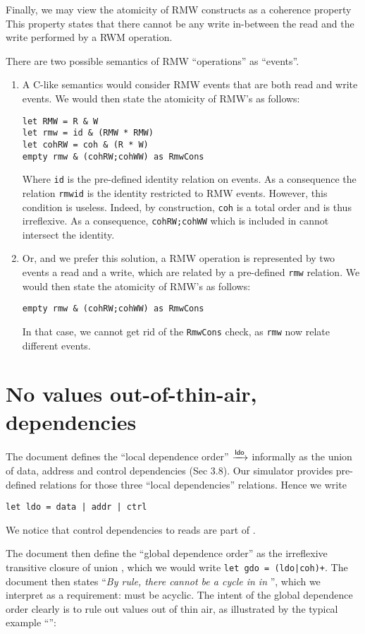 \documentclass[a4paper]{article}
\begin{document}
Finally, we may view the atomicity of RMW constructs as a coherence property
This property states that there cannot be any write in-between the read
and the write performed by a RWM operation.

There are two possible semantics of RMW ``operations'' as ``events''.
\begin{enumerate}
\item
A C-like semantics would consider RMW events that are both read and write
events. We would then state the atomicity of RMW's as follows:
\begin{verbatim}
let RMW = R & W
let rmw = id & (RMW * RMW)
let cohRW = coh & (R * W)
empty rmw & (cohRW;cohWW) as RmwCons
\end{verbatim}
Where \texttt{id} is the pre-defined identity relation on events.
As a consequence the relation \texttt{rmwid} is the identity restricted
to RMW events.
However, this condition is useless. Indeed, by construction,
\texttt{coh} is a total order and is thus irreflexive.
As a consequence, \texttt{cohRW;cohWW} which is included in \coh{}
cannot intersect the identity.
\item Or, and we prefer this solution, a RMW operation is represented
by two events a read and a write, which are related by a pre-defined
\texttt{rmw} relation.
We would then state the atomicity of RMW's as follows:
\begin{verbatim}
empty rmw & (cohRW;cohWW) as RmwCons
\end{verbatim}
In that case, we cannot get rid of the \texttt{RmwCons} check,
as \texttt{rmw} now relate different events.
\end{enumerate}

\section{No values out-of-thin-air, dependencies}
The document defines the ``local dependence order'' $\xrightarrow{\textsf{\scriptsize{}ldo}}$ informally
as the union of data, address and control dependencies (Sec 3.8).
Our simulator \herd{} provides pre-defined relations for those three
``local dependencies'' relations.
Hence we write
\begin{verbatim}
let ldo = data | addr | ctrl
\end{verbatim}
We notice that control dependencies to reads are part of \ldo.

The document  then define the ``global dependence order'' as
the irreflexive transitive closure of \ldo{} union \coh{},
which we would write \verb!let gdo = (ldo|coh)+!.
The document then states
``\emph{By rule, there cannot be a cycle in in \gdo{}}'',
which we interpret as a requirement: \gdo{} must be acyclic.
The intent of the global dependence order clearly is to rule out
values out of thin air, as illustrated by
the typical example ``'':
\begin{center}\end{center}
\end{document}
